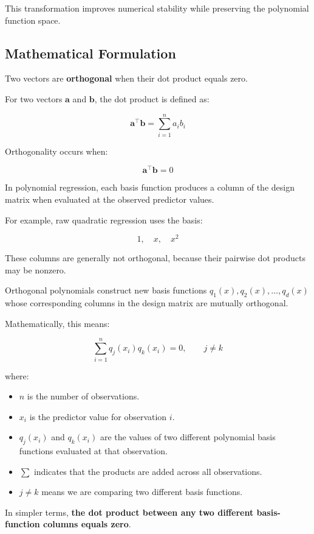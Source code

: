 \documentclass[
  letterpaper,
  DIV=11,
  numbers=noendperiod]{scrreprt}
\providecommand{\tightlist}{%
  \setlength{\itemsep}{0pt}\setlength{\parskip}{0pt}}
\begin{document}
This transformation improves numerical stability while preserving the
polynomial function space.

\subsection{Mathematical Formulation}\label{mathematical-formulation-3}

Two vectors are \textbf{orthogonal} when their dot product equals zero.

For two vectors \(\mathbf{a}\) and \(\mathbf{b}\), the dot product is
defined as:

\[
\mathbf{a}^{\top}\mathbf{b}
=
\sum_{i=1}^{n}a_ib_i
\]

Orthogonality occurs when:

\[
\mathbf{a}^{\top}\mathbf{b}=0
\]

In polynomial regression, each basis function produces a column of the
design matrix when evaluated at the observed predictor values.

For example, raw quadratic regression uses the basis:

\[
1,\quad x,\quad x^2
\]

These columns are generally not orthogonal, because their pairwise dot
products may be nonzero.

Orthogonal polynomials construct new basis functions
\(q_1(x),q_2(x),\ldots,q_d(x)\) whose corresponding columns in the
design matrix are mutually orthogonal.

Mathematically, this means:

\[
\boxed{
\sum_{i=1}^{n}q_j(x_i)q_k(x_i)=0,
\qquad j\neq k
}
\]

where:

\begin{itemize}
\tightlist
\item
  \(n\) is the number of observations.
\item
  \(x_i\) is the predictor value for observation \(i\).
\item
  \(q_j(x_i)\) and \(q_k(x_i)\) are the values of two different
  polynomial basis functions evaluated at that observation.
\item
  \(\sum\) indicates that the products are added across all
  observations.
\item
  \(j\neq k\) means we are comparing two different basis functions.
\end{itemize}

In simpler terms, \textbf{the dot product between any two different
basis-function columns equals zero}.
\end{document}
